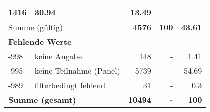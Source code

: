 \begin{longtable}{lXrrr}
       \num{1416} &
       \num[round-mode=places,round-precision=2]{30.94} &
         \num[round-mode=places,round-precision=2]{13.49} \\
     \midrule
     \multicolumn{2}{l}{Summe (gültig)} &
       \textbf{\num{4576}} &
     \textbf{\num{100}} &
       \textbf{\num[round-mode=places,round-precision=2]{43.61}} \\
     \multicolumn{5}{l}{\textbf{Fehlende Werte}}\\
       -998 &
       keine Angabe &
         \num{148} &
        - &
         \num[round-mode=places,round-precision=2]{1.41} \\
       -995 &
       keine Teilnahme (Panel) &
         \num{5739} &
        - &
         \num[round-mode=places,round-precision=2]{54.69} \\
       -989 &
       filterbedingt fehlend &
         \num{31} &
        - &
         \num[round-mode=places,round-precision=2]{0.3} \\
     \midrule
     \multicolumn{2}{l}{\textbf{Summe (gesamt)}} &
          \textbf{\num{10494}} &
        \textbf{-} &
        \textbf{\num{100}} \\
     \bottomrule
     \end{longtable}
     
